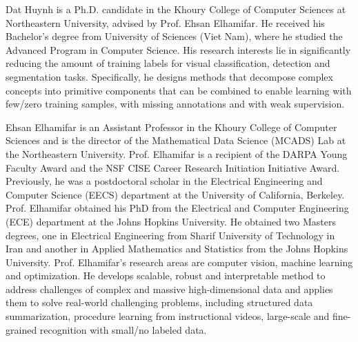 \documentclass[10pt,journal,compsoc]{IEEEtran}
\newcommand{\1}{\boldsymbol{1}}
\newcommand{\0}{\boldsymbol{0}}
\newcommand{\<}{\langle}
\renewcommand{\>}{\rangle}
\begin{document}
{\small


}

\begin{IEEEbiography}{Dat Huynh} is a Ph.D. candidate in the Khoury College of Computer Sciences at Northeastern University, advised by Prof. Ehsan Elhamifar. He received his Bachelor's degree from University of Sciences (Viet Nam), where he studied the Advanced Program in Computer Science.
His research interests lie in significantly reducing the amount of training labels for visual classification, detection and segmentation tasks. Specifically, he designs methods that decompose complex concepts into primitive components that can be combined to enable learning with few/zero training samples, with missing annotations and with weak supervision.
\end{IEEEbiography}


\begin{IEEEbiography}{Ehsan Elhamifar} is an Assistant Professor in the Khoury College of Computer Sciences and is the director of the Mathematical Data Science (MCADS) Lab at the Northeastern University. Prof. Elhamifar is a recipient of the DARPA Young Faculty Award and the NSF CISE Career Research Initiation Initiative Award. Previously, he was a postdoctoral scholar in the Electrical Engineering and Computer Science (EECS) department at the University of California, Berkeley. Prof. Elhamifar obtained his PhD from the Electrical and Computer Engineering (ECE) department at the Johns Hopkins University. He obtained two Masters degrees, one in Electrical Engineering from Sharif University of Technology in Iran and another in Applied Mathematics and Statistics from the Johns Hopkins University. Prof. Elhamifar’s research areas are computer vision, machine learning and optimization. He develops scalable, robust and interpretable method to address challenges of complex and massive high-dimensional data and applies them to solve real-world challenging problems, including structured data summarization, procedure learning from instructional videos, large-scale and fine-grained recognition with small/no labeled data.
\end{IEEEbiography}
\end{document}
